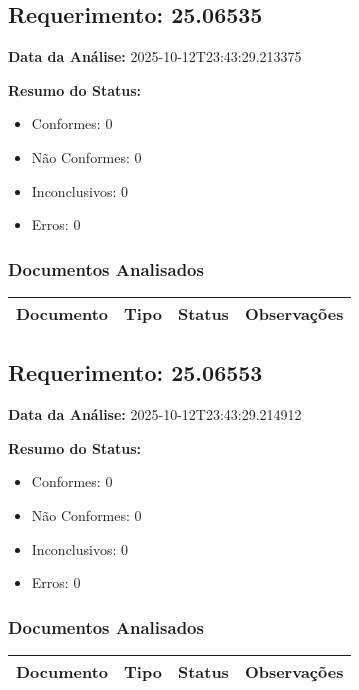 \documentclass[12pt,a4paper]{article}
\begin{document}
\subsection{Requerimento: 25.06535}

\textbf{Data da Análise:} 2025-10-12T23:43:29.213375

\textbf{Resumo do Status:}
\begin{itemize}
    \item Conformes: 0
    \item Não Conformes: 0
    \item Inconclusivos: 0
    \item Erros: 0
\end{itemize}

\subsubsection{Documentos Analisados}

\begin{longtable}{|p{4cm}|p{2cm}|p{2cm}|p{6cm}|}
\hline
\textbf{Documento} & \textbf{Tipo} & \textbf{Status} & \textbf{Observações} \\
\hline
\endhead
\end{longtable}


\subsection{Requerimento: 25.06553}

\textbf{Data da Análise:} 2025-10-12T23:43:29.214912

\textbf{Resumo do Status:}
\begin{itemize}
    \item Conformes: 0
    \item Não Conformes: 0
    \item Inconclusivos: 0
    \item Erros: 0
\end{itemize}

\subsubsection{Documentos Analisados}

\begin{longtable}{|p{4cm}|p{2cm}|p{2cm}|p{6cm}|}
\hline
\textbf{Documento} & \textbf{Tipo} & \textbf{Status} & \textbf{Observações} \\
\hline
\endhead
\end{longtable}
\end{document}
